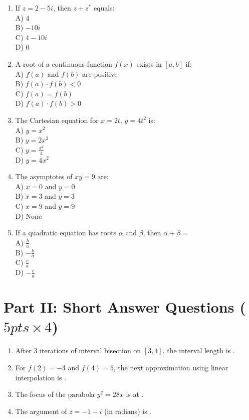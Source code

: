 \documentclass{sbs-exam}
\begin{document}
\begin{enumerate}
\item 
If $ z = 2 - 5i $, then $ z + z^* $ equals:\\
A) $ 4 $\\
B) $ -10i $\\
C) $ 4 - 10i $\\
D) $ 0 $

\item 
A root of a continuous function $f(x)$ exists in $[a, b]$ if:\\
A) $ f(a) $ and $ f(b) $ are positive\\
B) $ f(a) \cdot f(b) < 0 $\\
C) $ f(a) = f(b) $\\
D) $ f(a) \cdot f(b) > 0 $

\item 
The Cartesian equation for $ x = 2t $, $ y = 4t^2 $ is:\\
A) $ y = x^2 $\\
B) $ y = 2x^2 $\\
C) $ y = \frac{x^2}{4} $\\
D) $ y = 4x^2 $

\item 
The asymptotes of $ xy = 9 $ are:\\
A) $ x = 0 $ and $ y = 0 $\\
B) $ x = 3 $ and $ y = 3 $\\
C) $ x = 9 $ and $ y = 9 $\\
D) None

\item 
If a quadratic equation has roots $ \alpha $ and $ \beta $, then $ \alpha + \beta = $\\
A) $ \frac{b}{a} $\\
B) $ -\frac{b}{a} $\\
C) $ \frac{c}{a} $\\
D) $ -\frac{c}{a} $
\end{enumerate}

\section*{Part II: Short Answer Questions ($5 pts \times 4$)}
\begin{enumerate}
\item After 3 iterations of interval bisection on $[3, 4]$, the interval length is \underline{\hspace{2cm}}.

\item For $ f(2) = -3 $ and $ f(4) = 5 $, the next approximation using linear interpolation is \underline{\hspace{2cm}}.

\item The focus of the parabola $ y^2 = 28x $ is at \underline{\hspace{2cm}}.

\item The argument of $ z = -1 - i $ (in radians) is \underline{\hspace{2cm}}.
\end{enumerate}
\end{document}
